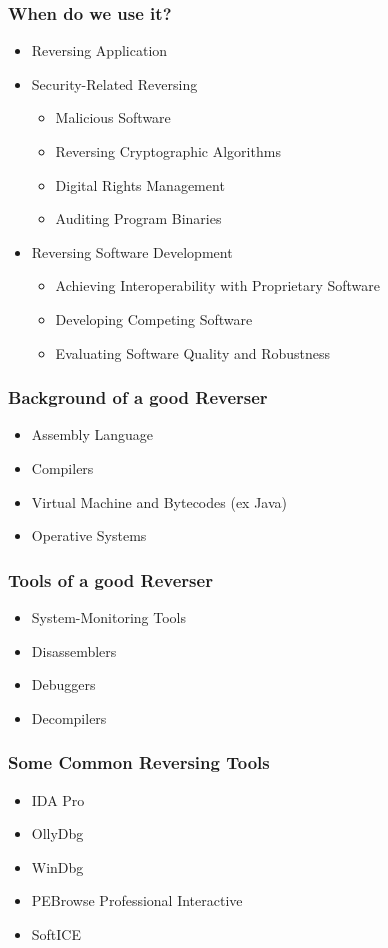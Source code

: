 \documentclass[]{beamer}
\begin{document}
		\begin{frame}
			\frametitle{When do we use it?}
			\begin{itemize}
				\item{Reversing Application}
				\item{Security-Related Reversing}
					\begin{itemize}
						\item{Malicious Software}
						\item{Reversing Cryptographic Algorithms}
						\item{Digital Rights Management}
						\item{Auditing Program Binaries}
					\end{itemize}
				\item{Reversing Software Development}
					\begin{itemize}
						\item{Achieving Interoperability with Proprietary Software}
						\item{Developing Competing Software}
						\item{Evaluating Software Quality and Robustness}
					\end{itemize}
			\end{itemize}			
		\end{frame}
		\begin{frame}
			\frametitle{Background of a good Reverser}
			\begin{itemize}
				\item{Assembly Language}
				\item{Compilers}
				\item{Virtual Machine and Bytecodes (ex Java)}
				\item{Operative Systems}
			\end{itemize}
		\end{frame}
		\begin{frame}
			\frametitle{Tools of a good Reverser}
				\begin{itemize}
					\item{System-Monitoring Tools}
					\item{Disassemblers}
					\item{Debuggers}
					\item{Decompilers}
				\end{itemize}
		\end{frame}
		\begin{frame}
			\frametitle{Some Common Reversing Tools}
			\begin{itemize}
				\item{IDA Pro}
				\item{OllyDbg}
				\item{WinDbg}
				\item{PEBrowse Professional Interactive}
				\item{SoftICE}
			\end{itemize}
		\end{frame}
\end{document}

